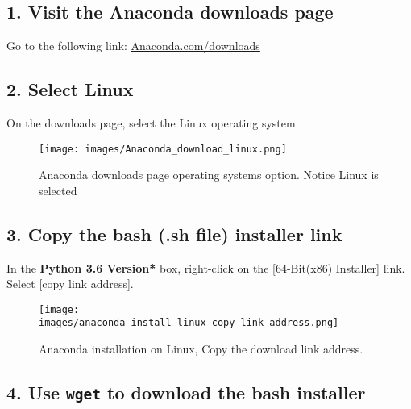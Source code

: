 \documentclass{book}
\makeatletter
\def\maxwidth{\ifdim\Gin@nat@width>\linewidth\linewidth
\else\Gin@nat@width\fi}
\let\Oldincludegraphics\includegraphics
\renewcommand{\includegraphics}[1]{\Oldincludegraphics[width=.8\maxwidth]{#1}}
\makeatother
\begin{document}
    
        \hypertarget{visit-the-anaconda-downloads-page}{%
\subsection{1. Visit the Anaconda downloads
page}\label{visit-the-anaconda-downloads-page}}

Go to the following link:
\href{https://www.anaconda.com/download/}{Anaconda.com/downloads}
    




    
        \hypertarget{select-linux}{%
\subsection{2. Select Linux}\label{select-linux}}

On the downloads page, select the Linux operating system

\begin{figure}
\centering
\texttt{[image: images/Anaconda\_download\_linux.png]}
\caption{Anaconda downloads page operating systems option. Notice Linux
is selected}
\end{figure}
    




    
        \hypertarget{copy-the-bash-.sh-file-installer-link}{%
\subsection{3. Copy the bash (.sh file) installer
link}\label{copy-the-bash-.sh-file-installer-link}}

In the \textbf{Python 3.6 Version* } box, right-click on the
{[}64-Bit(x86) Installer{]} link. Select {[}copy link address{]}.

\begin{figure}
\centering
\texttt{[image: images/anaconda\_install\_linux\_copy\_link\_address.png]}
\caption{Anaconda installation on Linux, Copy the download link
address.}
\end{figure}
    




    
        \hypertarget{use-wget-to-download-the-bash-installer}{%
\subsection{\texorpdfstring{4. Use \texttt{wget} to download the bash
installer}{4. Use wget to download the bash installer}}\label{use-wget-to-download-the-bash-installer}}
\end{document}

